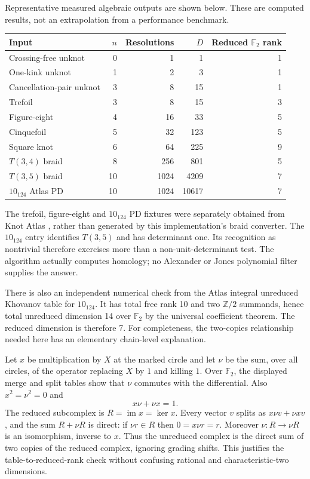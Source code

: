 \documentclass[11pt]{article}
\theoremstyle{definition}
\newcommand{\F}{\mathbb F_2}
\begin{document}
Representative measured algebraic outputs are shown below. These are
computed results, not an extrapolation from a performance benchmark.
\begin{center}
\begin{tabular}{@{}lrrrr@{}}
\toprule
Input & $n$ & Resolutions & $D$ & Reduced $\F$ rank \\
\midrule
Crossing-free unknot & 0 & 1 & 1 & 1 \\
One-kink unknot & 1 & 2 & 3 & 1 \\
Cancellation-pair unknot & 3 & 8 & 15 & 1 \\
Trefoil & 3 & 8 & 15 & 3 \\
Figure-eight & 4 & 16 & 33 & 5 \\
Cinquefoil & 5 & 32 & 123 & 5 \\
Square knot & 6 & 64 & 225 & 9 \\
$T(3,4)$ braid & 8 & 256 & 801 & 5 \\
$T(3,5)$ braid & 10 & 1024 & 4209 & 7 \\
$10_{124}$ Atlas PD & 10 & 1024 & 10617 & 7 \\
\bottomrule
\end{tabular}
\end{center}

The trefoil, figure-eight and $10_{124}$ PD fixtures were separately obtained
from Knot Atlas \cite{atlas}, rather than generated by this implementation's
braid converter. The $10_{124}$ entry identifies $T(3,5)$ and has determinant
one. Its recognition as nontrivial therefore exercises more than a
non-unit-determinant test. The algorithm actually computes homology; no
Alexander or Jones polynomial filter supplies the answer.

There is also an independent numerical check from the Atlas integral
unreduced Khovanov table for $10_{124}$. It has total free rank 10 and two
$\mathbb Z/2$ summands, hence total unreduced dimension 14 over $\F$ by the
universal coefficient theorem. The reduced dimension is therefore 7. For
completeness, the two-copies relationship needed here has an elementary
chain-level explanation.

Let $x$ be multiplication by $X$ at the marked circle and let $\nu$ be the
sum, over all circles, of the operator replacing $X$ by $1$ and killing $1$.
Over $\F$, the displayed merge and split tables show that $\nu$ commutes
with the differential. Also $x^2=\nu^2=0$ and
\[
 x\nu+\nu x=1.
\]
The reduced subcomplex is $R=\operatorname{im}x=\ker x$. Every vector $v$
splits as $x\nu v+\nu xv$, and the sum $R+\nu R$ is direct: if
$\nu r\in R$ then $0=x\nu r=r$. Moreover $\nu:R\to\nu R$ is an
isomorphism, inverse to $x$. Thus the unreduced complex is the direct sum of
two copies of the reduced complex, ignoring grading shifts. This justifies
the table-to-reduced-rank check without confusing rational and
characteristic-two dimensions.
\end{document}
